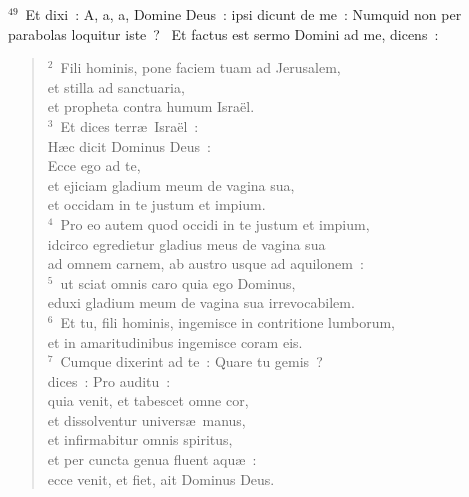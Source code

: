${}^{49}$~Et dixi~: A, a, a, Domine Deus~: ipsi dicunt de me~: Numquid non per parabolas loquitur iste~?
~Et factus est sermo Domini ad me, dicens~:
\begin{flushleft}\begin{verse}\vspace{6pt}${}^{2}$~Fili hominis, pone faciem tuam ad Jerusalem,\\ et stilla ad sanctuaria,\\ et propheta contra humum Isra\"el.\\
${}^{3}$~Et dices terr\ae\ Isra\"el~:\\ H\ae c dicit Dominus Deus~:\\ Ecce ego ad te,\\ et ejiciam gladium meum de vagina sua,\\ et occidam in te justum et impium.\\
${}^{4}$~Pro eo autem quod occidi in te justum et impium,\\ idcirco egredietur gladius meus de vagina sua\\ ad omnem carnem, ab austro usque ad aquilonem~:\\
${}^{5}$~ut sciat omnis caro quia ego Dominus,\\ eduxi gladium meum de vagina sua irrevocabilem.\\
${}^{6}$~Et tu, fili hominis, ingemisce in contritione lumborum,\\ et in amaritudinibus ingemisce coram eis.\\
${}^{7}$~Cumque dixerint ad te~: Quare tu gemis~?\\ dices~: Pro auditu~:\\ quia venit, et tabescet omne cor,\\ et dissolventur univers\ae\ manus,\\ et infirmabitur omnis spiritus,\\ et per cuncta genua fluent aqu\ae~:\\ ecce venit, et fiet, ait Dominus Deus.\end{verse}\end{flushleft}


